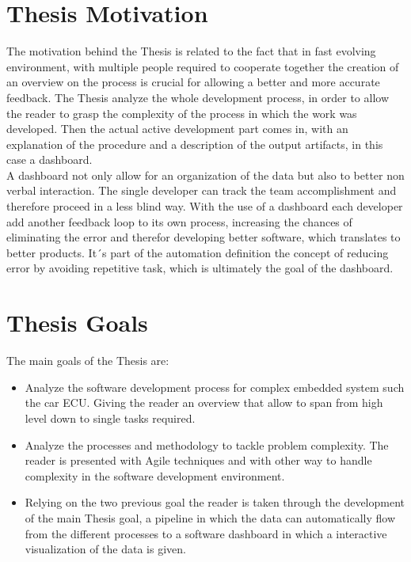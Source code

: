 \documentclass[../main.tex]{subfiles}
\begin{document}
\section{Thesis Motivation}
The motivation behind the Thesis is related to the fact that in fast evolving environment, with multiple people required to cooperate together the creation of an overview on the process is crucial for allowing a better and more accurate feedback. 
The Thesis analyze the whole development process, in order to allow the reader to grasp the complexity of the process in which the work was developed. Then the actual active development part comes in, with an explanation of the procedure and a description of the output artifacts, in this case a dashboard.\\
A dashboard not only allow for an organization of the data but also to better non verbal interaction. The single developer can track the team accomplishment and therefore proceed in a less blind way. With the use of a dashboard each developer add another feedback loop to its own process, increasing the chances of eliminating the error and therefor developing better software, which translates to better products. It´s part of the automation definition the concept of reducing error by avoiding repetitive task, which is ultimately the goal of the dashboard. 
\section{Thesis Goals}
The main goals of the Thesis are:
\begin{itemize}
    \item Analyze the software development process for complex embedded system such the car \gls{ECU}. Giving the reader an overview that allow to span from high level down to single tasks required. 
    \item Analyze the processes and methodology to tackle problem complexity. The reader is presented with Agile techniques and with other way to handle complexity in the software development environment.
    \item Relying on the two previous goal the reader is taken through the development of the main Thesis goal, a pipeline in which the data can automatically flow from the different processes to a software dashboard in which a interactive visualization of the data is given. 
\end{itemize}
\cleardoublepage
\end{document}
